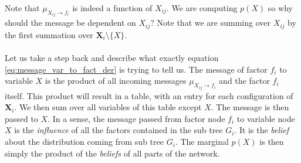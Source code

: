 \noindent
Note that $\mu_{X_{ij} \rightarrow f_i}$ is indeed a function of
$X_{ij}$. We are computing $p(X)$ so why should the message be 
dependent on $X_{ij}$? Note that we are summing over $X_{ij}$ by 
the first summation over $\textbf{X}_i \setminus \{X\}$. 
\\\\
Let us
take a step back and describe what exactly equation 
\ref{eq:message_var_to_fact_der} is trying to tell us. The message
of factor $f_i$ to variable $X$ is the product of all incoming
messages $\mu_{X_{ij} \rightarrow f_i}$ and the factor $f_i$ itself.
This product will result in a table, with an entry for each configuration
of $\textbf{X}_i$. We then sum over all variables of this table
except $X$. The message is then passed to $X$. In a sense, the message
passed from factor node $f_i$ to variable node $X$ is the \textit{influence}
of all the factors contained in the sub tree $G_i$. It is the \textit{belief}
about the distribution coming from sub tree $G_i$. The marginal
$p(X)$ is then simply the product of the \textit{beliefs}
of all parts of the network.

